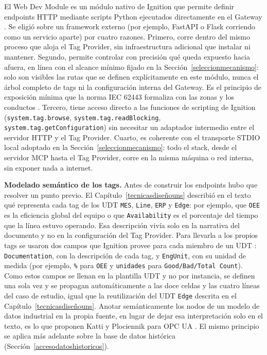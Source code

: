 El Web Dev Module es un módulo nativo de Ignition que permite definir endpoints HTTP mediante scripts Python ejecutados directamente en el Gateway \cite{ignition_webdev}. Se eligió sobre un framework externo (por ejemplo, FastAPI o Flask corriendo como un servicio aparte) por cuatro razones. Primero, corre dentro del mismo proceso que aloja el Tag Provider, sin infraestructura adicional que instalar ni mantener. Segundo, permite controlar con precisión qué queda expuesto hacia afuera, en línea con el alcance mínimo fijado en la Sección~\ref{seleccionmecanismo}: solo son visibles las rutas que se definen explícitamente en este módulo, nunca el árbol completo de tags ni la configuración interna del Gateway. Es el principio de exposición mínima que la norma IEC 62443 formaliza con las zonas y los conductos \cite{Jaatun2026Zones}. Tercero, tiene acceso directo a las funciones de scripting de Ignition
(\texttt{system.tag.browse}, \texttt{system.tag.readBlocking},
\texttt{system.tag.getConfiguration}) sin necesitar un adaptador intermedio entre el servidor HTTP y el Tag Provider. Cuarto, es coherente con el transporte STDIO local adoptado en la Sección~\ref{seleccionmecanismo}: todo el stack, desde el servidor MCP hasta el Tag Provider, corre en la misma máquina o red interna, sin exponer nada a internet.

\medskip
\noindent\textbf{Modelado semántico de los tags.}\quad
\label{modeladosemantico}
Antes de construir los endpoints hubo que resolver un punto previo. El Capítulo~\ref{tecnicasdiseñouns} describió en el texto qué representa cada tag de los UDT \texttt{MES}, \texttt{Line}, \texttt{ERP} y \texttt{Edge}: por ejemplo, que \texttt{OEE} es la eficiencia global del equipo o que \texttt{Availability} es el porcentaje del tiempo que la línea estuvo operando. Esa descripción vivía solo en la narrativa del documento y no en la configuración del Tag Provider. Para llevarla a los propios tags se usaron dos campos que Ignition provee para cada miembro de un UDT \cite{ignition_tags}: \texttt{Documentation}, con la descripción de cada tag, y \texttt{EngUnit}, con su unidad de medida (por ejemplo, \texttt{\%} para \texttt{OEE} y \texttt{unidades} para \texttt{Good/Bad/Total Count}). Como estos campos se llenan en la plantilla UDT y no por instancia, se definen una sola vez y se propagan automáticamente a las doce celdas y las cuatro líneas del caso de estudio, igual que la reutilización del UDT \texttt{Edge} descrita en el Capítulo~\ref{tecnicasdiseñouns}. Anotar semánticamente los nodos de un modelo de datos industrial en la propia fuente, en lugar de dejar esa interpretación solo en el texto, es lo que proponen Katti y Plociennik para OPC UA \cite{KattiOPCUASemantics2018}. El mismo principio se aplica más adelante sobre la base de datos histórica (Sección~\ref{accesodatoshistoricos}).

